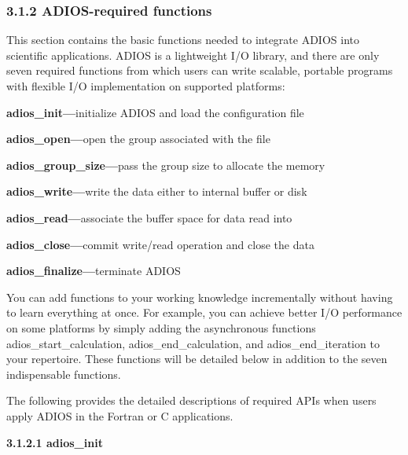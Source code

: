 \vspace{10pt}
\subsubsection*{{\large \textbf{3.1.2 ADIOS-required functions}}}

\vspace{10pt}
This section contains the basic functions needed to integrate ADIOS into scientific 
applications. ADIOS is a lightweight I/O library, and there are only seven required 
functions from which users can write scalable, portable programs with flexible 
I/O implementation on supported platforms:

\vspace{10pt}
\textbf{adios\_init---}initialize ADIOS and load the configuration file

\vspace{10pt}
\textbf{adios\_open---}open the group associated with the file

\vspace{10pt}
\textbf{adios\_group\_size---}pass the group size to allocate the memory

\vspace{10pt}
\textbf{adios\_write---}write the data either to internal buffer or disk

\vspace{10pt}
\textbf{adios\_read---}associate the buffer space for data read into

\vspace{10pt}
\textbf{adios\_close---}commit write/read operation and close the data

\vspace{10pt}
\textbf{adios\_finalize---}terminate ADIOS

\vspace{22pt}
You can add functions to your working knowledge incrementally without having to 
learn everything at once. For example, you can achieve better I/O performance on 
some platforms by simply adding the asynchronous functions adios\_start\_calculation, 
adios\_end\_calculation, and adios\_end\_iteration to your repertoire. These functions 
will be detailed below in addition to the seven indispensable functions.

\vspace{22pt}
The following provides the detailed descriptions of required APIs when users apply 
ADIOS in the Fortran or C applications.

\vspace{10pt}
\textbf{3.1.2.1 adios\_init}


